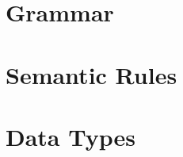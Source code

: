 \documentclass[11pt]{book}
\begin{document}
\section{Grammar}

\section{Semantic Rules}

\section{Data Types}




\end{document}
